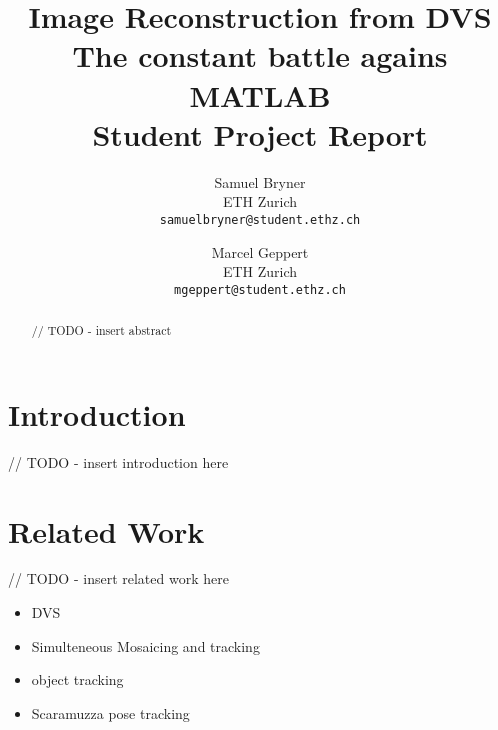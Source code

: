 \documentclass[10pt,twocolumn,letterpaper]{article}
\begin{document}
\title{Image Reconstruction from DVS\\ The constant battle agains MATLAB\\ Student Project Report}

\author{Samuel Bryner\\
ETH Zurich\\
{\tt\small samuelbryner@student.ethz.ch}
\and
Marcel Geppert\\
ETH Zurich\\
{\tt\small mgeppert@student.ethz.ch}
}

\maketitle

\begin{abstract}

// TODO - insert abstract

\end{abstract}

\section{Introduction}

// TODO - insert introduction here

\section{Related Work}

// TODO - insert related work here

\begin{itemize}
\item DVS \cite{lpd08dvs}
\item Simulteneous Mosaicing and tracking \cite{kim2014simultaneous}
\item object tracking \cite{vmv.20141280}
\item Scaramuzza pose tracking \cite{mueggler2014event}
\end{itemize}
\end{document}
